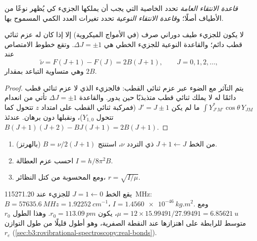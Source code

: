 \begin{definition}\label{def:b3:rovibrational-spectroscopy:selection}
\emph{قاعدة الانتقاء العامة} تحدد الخاصية
التي يجب أن يملكها الجزيء كي يُظهر نوعًا من الأطياف أصلًا؛ 
و\emph{قاعدة الانتقاء النوعية} تحدد
تغيرات العدد الكمي المسموح بها.
\end{definition}

\begin{proposition}\label{prop:b3:rovibrational-spectroscopy:rotational-lines}
لا يكون للجزيء طيف دوراني صرف (في الأمواج الميكروية) إلا إذا كان له
عزم ثنائي قطب دائم؛ والقاعدة النوعية للجزيء الخطي هي $\Delta J
= \pm1$. وتقع خطوط الامتصاص عند
\[
\tilde\nu = F(J+1) - F(J) = 2B(J + 1), \qquad J = 0, 1, 2, \dots,
\]
وهي متساوية التباعد بمقدار $2B$.
\end{proposition}

\begin{proof}
يتم التآثر مع الضوء عبر عزم ثنائي القطب: فالجزيء الذي لا عزم ثنائي قطب
دائمًا له لا يملك ثنائي قطب متذبذبًا حين يدور. والقاعدة $\Delta J
= \pm1$ تأتي من انعدام $\int Y_{J'M'}^*\cos\theta\,Y_{JM}$ ما لم يكن $J' = J
\pm 1$ (فمركبة ثنائي القطب على امتداد $z$ تتحول كما تتحول $Y_{1,0}$)، ونقبلها دون برهان.
عندئذ $B(J+1)(J+2) - BJ(J+1) = 2B(J+1)$.
\end{proof}

\begin{method}\label{met:b3:rovibrational-spectroscopy:bond-length}
\begin{enumerate}
  \item من الخط $J + 1 \leftarrow J$ ذي التردد $\nu$، استنتج $B =
        \nu/2(J+1)$ (بالهرتز).
  \item احسب عزم العطالة $I = h/8\pi^2B$.
  \item ومع  المحسوبة من كتل النظائر، $r = \sqrt{I/\mu}$.
\end{enumerate}
\end{method}

\begin{example}\label{ex:b3:rovibrational-spectroscopy:co}
يقع الخط $J = 1 \leftarrow 0$ للجزيء  عند \qty{115271.20}{MHz}:
$B = \qty{57635.6}{MHz} = \qty{1.92252}{cm^{-1}}$، $I = \qty{1.4560e-46}{kg.m^2}$.
ومع $\mu = 12 \times 15.99491/27.99491 = \qty{6.85621}{u}$، يكون $r_0 = \qty{113.09}{pm}$.
وهذا الطول $r_0$ متوسط للرابطة على اهتزازها عند النقطة الصفرية، وهو أطول قليلًا
من طول التوازن $r_e$ (\cref{sec:b3:rovibrational-spectroscopy:real-bonds}).
\end{example}

